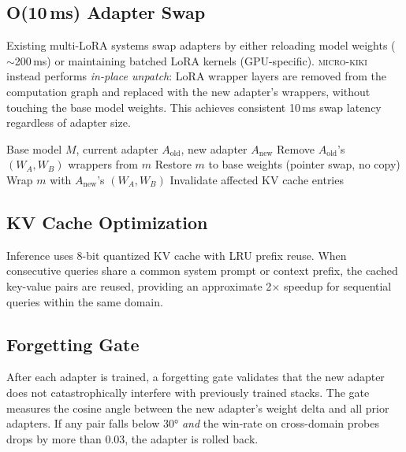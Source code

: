 \documentclass[11pt,a4paper]{article}
\begin{document}
\subsection{O(10\,ms) Adapter Swap}

Existing multi-LoRA systems swap adapters by either reloading model weights ($\sim$200\,ms) or maintaining batched LoRA kernels (GPU-specific). \textsc{micro-kiki} instead performs \emph{in-place unpatch}: LoRA wrapper layers are removed from the computation graph and replaced with the new adapter's wrappers, without touching the base model weights. This achieves consistent 10\,ms swap latency regardless of adapter size.

\begin{algorithm}[h]
\caption{In-place LoRA unpatch and swap}
\label{alg:swap}
\begin{algorithmic}
\REQUIRE Base model $M$, current adapter $A_\text{old}$, new adapter $A_\text{new}$
  \STATE Remove $A_\text{old}$'s $(W_A, W_B)$ wrappers from $m$
  \STATE Restore $m$ to base weights (pointer swap, no copy)
\ENDFOR
{}
  \STATE Wrap $m$ with $A_\text{new}$'s $(W_A, W_B)$
\ENDFOR
\STATE Invalidate affected KV cache entries
\end{algorithmic}
\end{algorithm}

\subsection{KV Cache Optimization}

Inference uses 8-bit quantized KV cache with LRU prefix reuse. When consecutive queries share a common system prompt or context prefix, the cached key-value pairs are reused, providing an approximate 2$\times$ speedup for sequential queries within the same domain.

\subsection{Forgetting Gate}

After each adapter is trained, a forgetting gate validates that the new adapter does not catastrophically interfere with previously trained stacks. The gate measures the cosine angle between the new adapter's weight delta and all prior adapters. If any pair falls below 30° \emph{and} the win-rate on cross-domain probes drops by more than 0.03, the adapter is rolled back.
\end{document}

